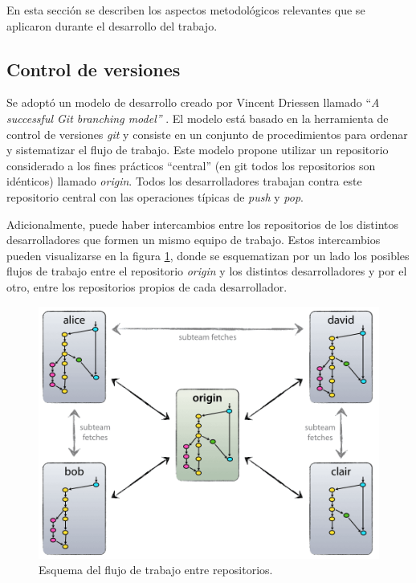 En esta sección se describen los aspectos metodológicos relevantes que se aplicaron durante el desarrollo del trabajo.  

\subsection{Control de versiones}
\label{subsec:branching}

Se adoptó un modelo de desarrollo creado por Vincent Driessen llamado ``\textit{A successful Git branching model''} \citep{Driessen}.  El modelo está basado en la herramienta de control de versiones \textit{git} y consiste en un conjunto de procedimientos para ordenar y sistematizar el flujo de trabajo. Este modelo propone utilizar un repositorio considerado a los fines prácticos ``central'' (en git todos los repositorios son idénticos) llamado \textit{origin}.  Todos los desarrolladores trabajan contra este repositorio central con las operaciones típicas de \textit{push} y \textit{pop}.  

Adicionalmente, puede haber intercambios entre los repositorios de los distintos desarrolladores que formen un mismo equipo de trabajo. Estos intercambios pueden visualizarse en la figura \ref{fig:esquema-repos}, donde se esquematizan por un lado los posibles flujos de trabajo entre el repositorio \textit{origin} y los distintos desarrolladores y por el otro, entre los repositorios propios de cada desarrollador. 

\begin{figure}[h]
	\centering
	\includegraphics[width=.6\textwidth]{./Figures/centr-decentr@2x.png}
	\caption[Esquema del flujo de trabajo entre repositorios]{Esquema del flujo de trabajo entre repositorios\protect\footnotemark.}
	\label{fig:esquema-repos}
\end{figure}



